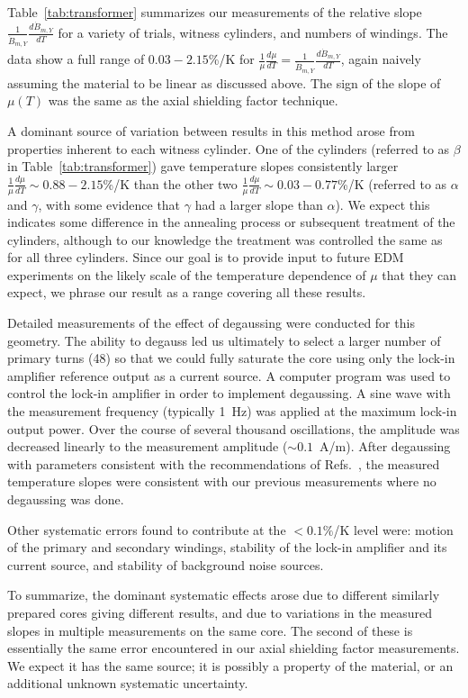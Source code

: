 Table~\ref{tab:transformer} summarizes our measurements of the
relative slope $\frac{1}{\dot{B}_{m,Y}}\frac{d\dot{B}_{m,Y}}{dT}$ for
a variety of trials, witness cylinders, and numbers of windings.  The
data show a full range of $0.03-2.15$\%/K for
$\frac{1}{\mu}\frac{d\mu}{dT}=\frac{1}{\dot{B}_{m,Y}}\frac{d\dot{B}_{m,Y}}{dT}$,
again naively assuming the material to be linear as discussed above.
The sign of the slope of $\mu(T)$ was the same as the axial shielding
factor technique.

A dominant source of variation between results in this method arose
from properties inherent to each witness cylinder.  One of the
cylinders (referred to as $\beta$ in Table~\ref{tab:transformer}) gave
temperature slopes consistently larger
$\frac{1}{\mu}\frac{d\mu}{dT}\sim 0.88-2.15$\%/K than the other two
$\frac{1}{\mu}\frac{d\mu}{dT}\sim 0.03-0.77$\%/K (referred to as
$\alpha$ and $\gamma$, with some evidence that $\gamma$ had a larger
slope than $\alpha$).  We expect this indicates some difference in the
annealing process or subsequent treatment of the cylinders, although
to our knowledge the treatment was controlled the same as for all
three cylinders.  Since our goal is to provide input to future EDM
experiments on the likely scale of the temperature dependence of $\mu$
that they can expect, we phrase our result as a range covering all
these results.

Detailed measurements of the effect of degaussing were conducted for
this geometry.  The ability to degauss led us ultimately to select a
larger number of primary turns (48) so that we could fully saturate
the core using only the lock-in amplifier reference output as a
current source.  A computer program was used to control the lock-in
amplifier in order to implement degaussing.  A sine wave with the
measurement frequency (typically 1~Hz) was applied at the maximum
lock-in output power.  Over the course of several thousand
oscillations, the amplitude was decreased linearly to the measurement
amplitude ($\sim 0.1$~A/m).  After degaussing with parameters
consistent with the recommendations of
Refs.~\cite{bib:thiel,bib:altarev2015}, the measured temperature
slopes were consistent with our previous measurements where no
degaussing was done.

Other systematic errors found to contribute at the $<0.1\%$/K level
were: motion of the primary and secondary windings, stability of the
lock-in amplifier and its current source, and stability of background
noise sources.

To summarize, the dominant systematic effects arose due to different
similarly prepared cores giving different results, and due to
variations in the measured slopes in multiple measurements on the same
core.  The second of these is essentially the same error encountered
in our axial shielding factor measurements.  We expect it has the same
source; it is possibly a property of the material, or an additional
unknown systematic uncertainty.
